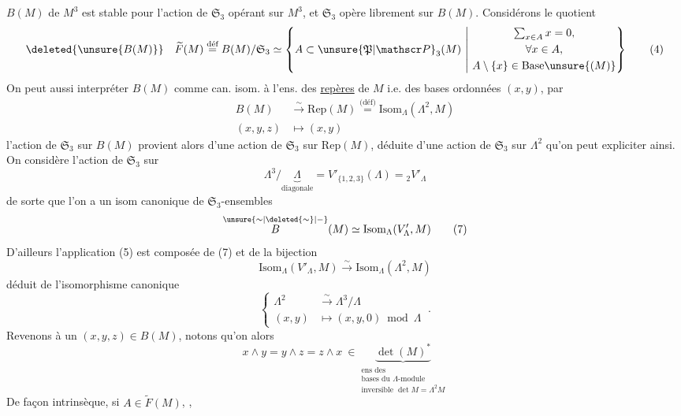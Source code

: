   $B(M)$ de $M^3$ est stable pour l'action de $\mathfrak{S}_3$ opérant sur $M^3$, et $\mathfrak{S}_3$ opère librement sur $B(M)$. Considérons le quotient
\[
\deleted{\unsure{B(M)}}\quad\widetilde F(M)\overset{\text{déf}}{=}B(M)/\mathfrak{S}_3\simeq
\left\{A\subset\unsure{\mathfrak P|\mathscr P}_3(M)\ \middle|\ 
\begin{gathered}\textstyle\sum_{x\in A}x=0,\\ \forall x\in A,\\ A\setminus\{x\}\in\mathrm{Base}\unsure{(M)}\end{gathered}\right\}\tag*{(4)}
\]
 On peut aussi interpréter $B(M)$ comme can. isom. à l'ens. des \uline{repères} de $M$ i.e. des bases ordonnées $(x,y)$, par
\[
\begin{aligned}
B(M)&\xrightarrow{\sim}\mathrm{Rep}(M)\overset{\text{(déf)}}{=}\mathrm{Isom}_{\Lambda}(\Lambda^2,M)\\
(x,y,z)&\longmapsto (x,y)
\end{aligned}\tag*{(5)}
\]
l'action de $\mathfrak{S}_3$ sur $B(M)$ provient alors d'une action de $\mathfrak{S}_3$ sur $\mathrm{Rep}(M)$, déduite
d'une action de $\mathfrak{S}_3$ sur  $\Lambda^2$ qu'on peut expliciter ainsi. On considère l'action de $\mathfrak{S}_3$ sur
\[
\Lambda^3/\underbrace{\Lambda}_{\text{diagonale}}=V'_{\{1,2,3\}}(\Lambda)={}_{2}V'_{\Lambda}\tag*{(6)}
\]
de sorte que l'on a un isom canonique de $\mathfrak{S}_3$-ensembles
\[
\overset{\unsure{\sim|\deleted{\sim}|-}}{B}(M)\simeq\mathrm{Isom}_{\Lambda}(V'_{\Lambda},M)\tag*{(7)}
\]
D'ailleurs  l'application (5) est composée de (7) et de la bijection
\[
\mathrm{Isom}_{\Lambda}(V'_{\Lambda},M)\xrightarrow{\sim}\mathrm{Isom}_{\Lambda}(\Lambda^2,M)
\]
déduit de l'isomorphisme canonique
\[
\left\{\begin{aligned}
\Lambda^2&\xrightarrow{\sim}\Lambda^3/\Lambda\\
(x,y)&\longmapsto(x,y,0)\bmod\Lambda
\end{aligned}\right. \ .\tag*{(8)}
\]
Revenons à un $(x,y,z)\in B(M)$, notons qu'on  alors
\[
x\wedge y=y\wedge z=z\wedge x\ \in
\underbrace{\det(M)^*}_{\substack{\text{ens des}\\\text{bases du }\Lambda\text{-module}\\\text{inversible }\det M=\Lambda^2 M}}\tag*{(9)}
\]
De façon intrinsèque, si $A\in\widetilde F(M)$,  ,
